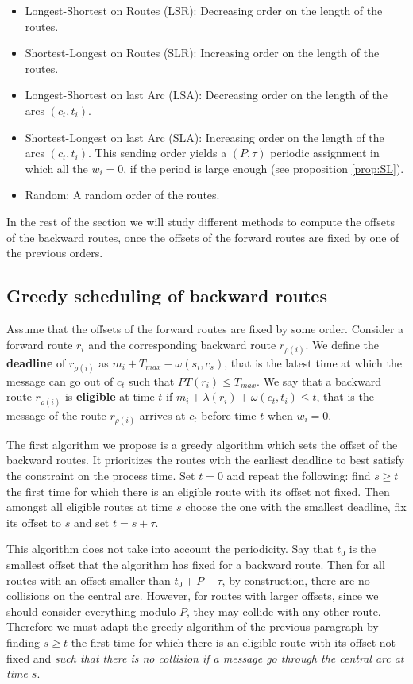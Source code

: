 \documentclass[a4paper,10pt]{article}
\begin{document}
{\begin{itemize}
	 \item Longest-Shortest on Routes (LSR): Decreasing order on the length of the routes.
	 \item Shortest-Longest on Routes (SLR): Increasing order on the length of the routes. 
	 \item Longest-Shortest on last Arc (LSA): Decreasing order on the length of the arcs $(c_t,t_i)$.
	 \item Shortest-Longest on last Arc (SLA): Increasing order on the length of the arcs $(c_t,t_i)$. This sending order yields a $(P,\tau)$ periodic assignment in which all the $w_i = 0$, if the period is large enough (see proposition \ref{prop:SL}).
	 \item Random: A random order of the routes.
	\end{itemize}

   In the rest of the section we will study different methods to compute the offsets of the backward routes, once
   the offsets of the forward routes are fixed by one of the previous orders.
   
   \subsection{Greedy scheduling of backward routes}
    
    Assume that the offsets of the forward routes are fixed by some order. 
    Consider a forward route $r_i$ and the corresponding backward route $r_{\rho(i)}$.
    We define the {\bf deadline} of $r_{\rho(i)}$ as $m_{i} + T_{max} - \omega(s_i,c_s)$, that is the latest time at which the message can go out of $c_t$ such that $PT(r_i) \leq T_{max}$.
    We say that a backward route $r_{\rho(i)}$ is {\bf eligible} at time $t$ if $m_{i} +  \lambda(r_i) + \omega(c_t,t_i) \leq t$, that is the message of the route $r_{\rho(i)}$ arrives at $c_t$ before time $t$ when $w_i = 0$.
    
    The first algorithm we propose is a greedy algorithm which sets the offset of the 
    backward routes. It prioritizes the routes with the earliest deadline to best satisfy the
    constraint on the process time.
    Set $t=0$ and repeat the following: find $s \geq t$ the first time for which there is an eligible route with its offset not fixed. Then amongst all eligible routes at time $s$ choose the one with the smallest deadline, fix its offset to $s$ and set $t = s + \tau$.
    
    This algorithm does not take into account the periodicity. Say that $t_0$ is the smallest offset that the algorithm has fixed
    for a backward route. Then for all routes with an offset smaller than $t_0 + P - \tau$,
    by construction, there are no collisions on the central arc.
    However, for routes with larger offsets, since we  should consider everything modulo $P$, 
    they may collide with any other route. Therefore we must adapt the greedy algorithm of the previous paragraph by finding $s \geq t$ the first time for which there is an eligible route with its offset not fixed and \emph{such that there is no collision if a message go
    through the central arc at time $s$}. 
    
}
\end{document}
